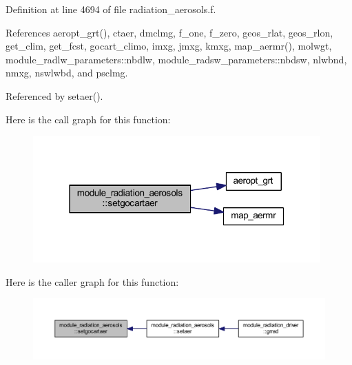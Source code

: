 Definition at line 4694 of file radiation\+\_\+aerosols.\+f.



References aeropt\+\_\+grt(), ctaer, dmclmg, f\+\_\+one, f\+\_\+zero, geos\+\_\+rlat, geos\+\_\+rlon, get\+\_\+clim, get\+\_\+fcst, gocart\+\_\+climo, imxg, jmxg, kmxg, map\+\_\+aermr(), molwgt, module\+\_\+radlw\+\_\+parameters\+::nbdlw, module\+\_\+radsw\+\_\+parameters\+::nbdsw, nlwbnd, nmxg, nswlwbd, and psclmg.



Referenced by setaer().



Here is the call graph for this function\+:\nopagebreak
\begin{figure}[H]
\begin{center}
\leavevmode
\includegraphics[width=313pt]{group__module__radiation__aerosols_ga685dc5ac4b7da2a375800bef712cbb8b_cgraph}
\end{center}
\end{figure}




Here is the caller graph for this function\+:
\nopagebreak
\begin{figure}[H]
\begin{center}
\leavevmode
\includegraphics[width=350pt]{group__module__radiation__aerosols_ga685dc5ac4b7da2a375800bef712cbb8b_icgraph}
\end{center}
\end{figure}



